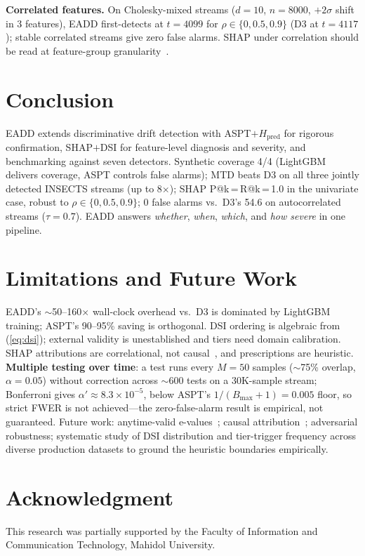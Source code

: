 \documentclass[conference,a4paper]{IEEEtran}
\begin{document}
\textbf{Correlated features.} On Cholesky-mixed streams ($d{=}10$, $n{=}8000$, $+2\sigma$ shift in 3 features), EADD first-detects at $t{=}4099$ for $\rho{\in}\{0, 0.5, 0.9\}$ (D3 at $t{=}4117$); stable correlated streams give zero false alarms. SHAP under correlation should be read at feature-group granularity~\cite{b33}.

\section{Conclusion}

EADD extends discriminative drift detection with ASPT$+H_{\text{pred}}$ for rigorous confirmation, SHAP$+$DSI for feature-level diagnosis and severity, and benchmarking against seven detectors. Synthetic coverage 4/4 (LightGBM delivers coverage, ASPT controls false alarms); MTD beats D3 on all three jointly detected INSECTS streams (up to 8$\times$); SHAP P@k\,{=}\,R@k\,{=}\,1.0 in the univariate case, robust to $\rho{\in}\{0,0.5,0.9\}$; 0 false alarms vs.\ D3's 54.6 on autocorrelated streams ($\tau{=}0.7$). EADD answers \textit{whether}, \textit{when}, \textit{which}, and \textit{how severe} in one pipeline.

\section{Limitations and Future Work}

EADD's $\sim$50--160$\times$ wall-clock overhead vs.\ D3 is dominated by LightGBM training; ASPT's 90--95\% saving is orthogonal. DSI ordering is algebraic from (\ref{eq:dsi}); external validity is unestablished and tiers need domain calibration. SHAP attributions are correlational, not causal~\cite{b33}, and prescriptions are heuristic. \textbf{Multiple testing over time}: a test runs every $M{=}50$ samples ($\sim$75\% overlap, $\alpha{=}0.05$) without correction across ${\sim}600$ tests on a 30K-sample stream; Bonferroni gives $\alpha'{\approx}8.3{\times}10^{-5}$, below ASPT's $1/(B_{\max}{+}1){=}0.005$ floor, so strict FWER is not achieved---the zero-false-alarm result is empirical, not guaranteed. Future work: anytime-valid e-values~\cite{b27}; causal attribution~\cite{b33}; adversarial robustness; systematic study of DSI distribution and tier-trigger frequency across diverse production datasets to ground the heuristic boundaries empirically.

\section*{Acknowledgment}
This research was partially supported by the Faculty of Information and Communication Technology, Mahidol University.
\end{document}
